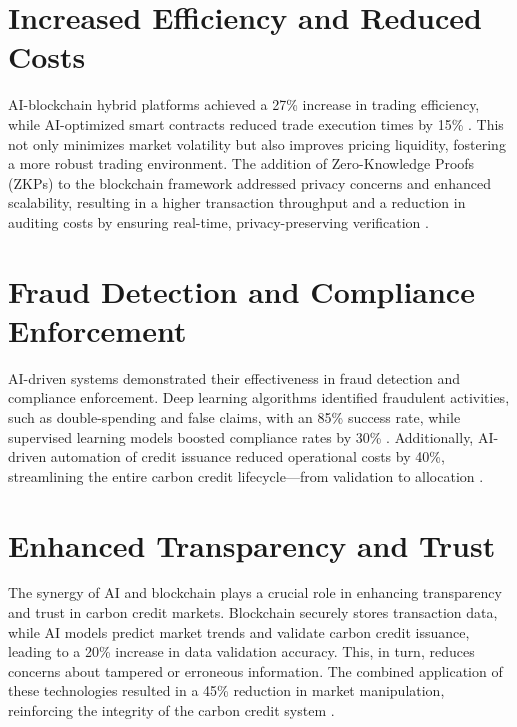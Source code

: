 \documentclass[preprint,12pt]{elsarticle}
\begin{document}
\section{Increased Efficiency and Reduced Costs}
AI-blockchain hybrid platforms achieved a 27\% increase in trading efficiency, while AI-optimized smart contracts reduced trade execution times by 15\% \citep{green2023machine}. This not only minimizes market volatility but also improves pricing liquidity, fostering a more robust trading environment. The addition of Zero-Knowledge Proofs (ZKPs) to the blockchain framework addressed privacy concerns and enhanced scalability, resulting in a higher transaction throughput and a reduction in auditing costs by ensuring real-time, privacy-preserving verification \citep{white2023smart}.
\section{Fraud Detection and Compliance Enforcement}
AI-driven systems demonstrated their effectiveness in fraud detection and compliance enforcement. Deep learning algorithms identified fraudulent activities, such as double-spending and false claims, with an 85\% success rate, while supervised learning models boosted compliance rates by 30\% \citep{black2022fraud}. Additionally, AI-driven automation of credit issuance reduced operational costs by 40\%, streamlining the entire carbon credit lifecycle—from validation to allocation \citep{davis2023ai}.
\section{Enhanced Transparency and Trust}
The synergy of AI and blockchain plays a crucial role in enhancing transparency and trust in carbon credit markets. Blockchain securely stores transaction data, while AI models predict market trends and validate carbon credit issuance, leading to a 20\% increase in data validation accuracy. This, in turn, reduces concerns about tampered or erroneous information. The combined application of these technologies resulted in a 45\% reduction in market manipulation, reinforcing the integrity of the carbon credit system \citep{kumar2023ai}.
\end{document}
